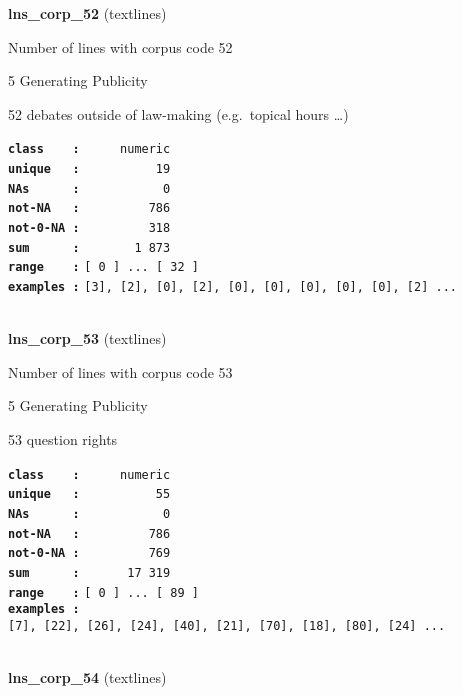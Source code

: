 \documentclass[]{article}
\begin{document}
\textbf{lns\_corp\_52} (textlines)

Number of lines with corpus code 52

5 Generating Publicity

52 debates outside of law-making (e.g.~topical hours \ldots{})

\textbf{\texttt{class\ \ \ \ :}} \texttt{~~~~~numeric}\\
\textbf{\texttt{unique\ \ \ :}} \texttt{~~~~~~~~~~19}\\
\textbf{\texttt{NAs\ \ \ \ \ \ :}} \texttt{~~~~~~~~~~~0}\\
\textbf{\texttt{not-NA\ \ \ :}} \texttt{~~~~~~~~~786}\\
\textbf{\texttt{not-0-NA\ :}} \texttt{~~~~~~~~~318}\\
\textbf{\texttt{sum\ \ \ \ \ \ :}} \texttt{~~~~~~~1~873}\\
\textbf{\texttt{range\ \ \ \ :}}
\texttt{{[}\ 0\ {]}\ ...\ {[}\ 32\ {]}}\\
\textbf{\texttt{examples\ :}}
\texttt{{[}3{]},\ {[}2{]},\ {[}0{]},\ {[}2{]},\ {[}0{]},\ {[}0{]},\ {[}0{]},\ {[}0{]},\ {[}0{]},\ {[}2{]}\ ...}\\

~

\textbf{lns\_corp\_53} (textlines)

Number of lines with corpus code 53

5 Generating Publicity

53 question rights

\textbf{\texttt{class\ \ \ \ :}} \texttt{~~~~~numeric}\\
\textbf{\texttt{unique\ \ \ :}} \texttt{~~~~~~~~~~55}\\
\textbf{\texttt{NAs\ \ \ \ \ \ :}} \texttt{~~~~~~~~~~~0}\\
\textbf{\texttt{not-NA\ \ \ :}} \texttt{~~~~~~~~~786}\\
\textbf{\texttt{not-0-NA\ :}} \texttt{~~~~~~~~~769}\\
\textbf{\texttt{sum\ \ \ \ \ \ :}} \texttt{~~~~~~17~319}\\
\textbf{\texttt{range\ \ \ \ :}}
\texttt{{[}\ 0\ {]}\ ...\ {[}\ 89\ {]}}\\
\textbf{\texttt{examples\ :}}
\texttt{{[}7{]},\ {[}22{]},\ {[}26{]},\ {[}24{]},\ {[}40{]},\ {[}21{]},\ {[}70{]},\ {[}18{]},\ {[}80{]},\ {[}24{]}\ ...}\\

~

\textbf{lns\_corp\_54} (textlines)
\end{document}
